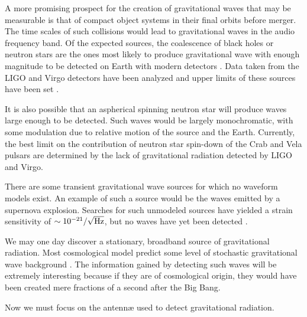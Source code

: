 A more promising prospect for the creation of gravitational waves that may be measurable is that of compact object systems in their final orbits before merger. %
The time scales of such collisions would lead to gravitational waves in the audio frequency band. %
Of the expected sources, the coalescence of black holes or neutron stars are the ones most likely to produce gravitational wave with enough magnitude to be detected on Earth with modern detectors \cite{CBCrates}. %
Data taken from the LIGO and Virgo detectors have been analyzed and upper limits of these sources have been set \cite{CBC,CBCblackholes}.

It is also possible that an aspherical spinning neutron star will produce waves large enough to be detected. %
Such waves would be largely monochromatic, with some modulation due to relative motion of the source and the Earth. %
Currently, the best limit on the contribution of neutron star spin-down of the Crab\cite{crab} and Vela\cite{Vela} pulsars are determined by the lack of gravitational radiation detected by LIGO and Virgo.

There are some transient gravitational wave sources for which no waveform models exist. %
An example of such a source would be the waves emitted by a supernova explosion. %
Searches for such unmodeled sources have yielded a strain sensitivity of $\sim 10^{-21} / \sqrt{\rm{Hz}}$, but no waves have yet been detected \cite{bursts}.

We may one day discover a stationary, broadband source of gravitational radiation. %
Most cosmological model predict some level of stochastic gravitational wave background \cite{bbn,stochdirectional}. %
The information gained by detecting such waves will be extremely interesting because if they are of cosmological origin, they would have been created mere fractions of a second after the Big Bang.

Now we must focus on the antenn\ae{} used to detect gravitational radiation.
